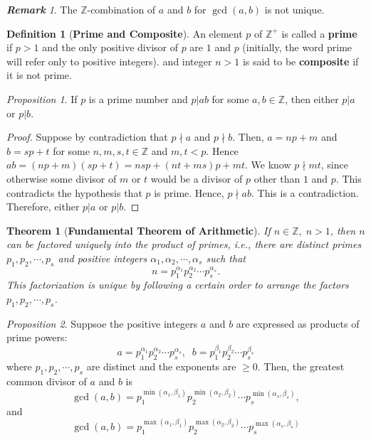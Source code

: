 \documentclass[paper=a4, fontsize=11pt]{scrartcl}
\newtheorem{theorem}{Theorem}[section]
\numberwithin{equation}{section}		%
\numberwithin{figure}{section}			%
\numberwithin{table}{section}				%
\renewcommand{\max}{\ensuremath{\operatorname{max}}}
\theoremstyle{definition}
\newtheorem{definition}{Definition}[section]
\theoremstyle{remark}
\newtheorem*{remark}{\textbf{Remark}}
\theoremstyle{example}
\newtheorem{prop}{Proposition}[section]
\begin{document}
\begin{remark}
    The $\mathbb{Z}$-combination of $a$ and $b$ for $\gcd(a,b)$ is not unique.
\end{remark}

\begin{definition}[\textbf{Prime and Composite}]
    An element $p$ of $\mathbb{Z}^{+}$ is called a \textbf{prime} if $p > 1$ and the only positive divisor of $p$ are $1$ and $p$ (initially, the word prime will refer only to positive integers). and integer $n > 1$ is said to be \textbf{composite} if it is not prime.
\end{definition}

\begin{prop}
    If $p$ is a prime number and $p\lvert ab$ for some $a,b\in\mathbb{Z}$, then either $p \lvert a$ or $p \lvert b$.
\end{prop}

\begin{proof}
    Suppose by contradiction that $p \nmid a$ and $p \nmid b$. Then, $a = np + m$ and $b = sp + t$ for some $n,m,s,t \in \mathbb{Z}$ and $m,t < p$. Hence $ab = (np+m)(sp+t) = nsp + (nt+ms)p + mt$. We know $p \nmid mt$, since otherwise some divisor of $m$ or $t$ would be a divisor of $p$ other than $1$ and $p$. This contradicts the hypothesis that $p$ is prime. Hence, $p \nmid ab$. This is a contradiction. Therefore, either $p \lvert a$ or $p \lvert b$.
\end{proof}

\begin{theorem}[\textbf{Fundamental Theorem of Arithmetic}]
    If $n \in \mathbb{Z}, \; n > 1$, then $n$ can be factored uniquely into the product of primes, i.e., there are distinct primes $p_1,p_2,\cdots,p_s$ and positive integers $\alpha_1,\alpha_2,\cdots,\alpha_s$ such that
    \begin{equation}
        n = p_1^{\alpha_1}p_2^{\alpha_2}\cdots p_s^{\alpha_s}.
    \end{equation}
    This factorization is unique by following a certain order to arrange the factors $p_1,p_2,\cdots,p_s$.
\end{theorem}

\begin{prop}
    Suppsoe the positive integers $a$ and $b$ are expressed as products of prime powers:
    \begin{equation}
        a = p_1^{\alpha_1}p_2^{\alpha_2}\cdots p_s^{\alpha_s}, \;\; b = p_1^{\beta_1}p_2^{\beta_2}\cdots p_s^{\beta_s}
    \end{equation}
    where $p_1, p_2,\cdots, p_s$ are distinct and the exponents are $\geq 0$. Then, the greatest common divisor of $a$ and $b$ is
    \begin{equation}
        \gcd(a,b) = p_1^{\min(\alpha_1,\beta_1)}p_2^{\min(\alpha_2,\beta_2)}\cdots p_s^{\min(\alpha_s,\beta_s)},
    \end{equation}
    and
    \begin{equation}
        \gcd(a,b) = p_1^{\max(\alpha_1,\beta_1)}p_2^{\max(\alpha_2,\beta_2)}\cdots p_s^{\max(\alpha_s,\beta_s)}
    \end{equation}
\end{prop}
\end{document}
